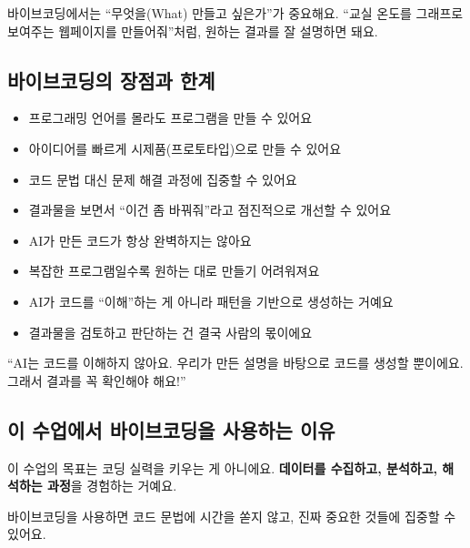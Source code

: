 \documentclass[11pt, a4paper]{article}
\begin{document}
바이브코딩에서는 ``무엇을(What) 만들고 싶은가''가 중요해요. ``교실 온도를 그래프로 보여주는 웹페이지를 만들어줘''처럼, 원하는 결과를 잘 설명하면 돼요.

\subsection{바이브코딩의 장점과 한계}

\begin{tipbox}[장점]
\begin{itemize}[leftmargin=1.5em]
\item 프로그래밍 언어를 몰라도 프로그램을 만들 수 있어요
\item 아이디어를 빠르게 시제품(프로토타입)으로 만들 수 있어요
\item 코드 문법 대신 문제 해결 과정에 집중할 수 있어요
\item 결과물을 보면서 ``이건 좀 바꿔줘''라고 점진적으로 개선할 수 있어요
\end{itemize}
\end{tipbox}

\begin{warnbox}[한계]
\begin{itemize}[leftmargin=1.5em]
\item AI가 만든 코드가 항상 완벽하지는 않아요
\item 복잡한 프로그램일수록 원하는 대로 만들기 어려워져요
\item AI가 코드를 ``이해''하는 게 아니라 패턴을 기반으로 생성하는 거예요
\item 결과물을 검토하고 판단하는 건 결국 사람의 몫이에요
\end{itemize}
\end{warnbox}

\begin{corebox}[핵심 메시지]
``AI는 코드를 이해하지 않아요. 우리가 만든 설명을 바탕으로 코드를 생성할 뿐이에요. 그래서 결과를 꼭 확인해야 해요!''
\end{corebox}

\subsection{이 수업에서 바이브코딩을 사용하는 이유}

이 수업의 목표는 코딩 실력을 키우는 게 아니에요. \textbf{데이터를 수집하고, 분석하고, 해석하는 과정}을 경험하는 거예요.

바이브코딩을 사용하면 코드 문법에 시간을 쏟지 않고, 진짜 중요한 것들에 집중할 수 있어요.
\end{document}
